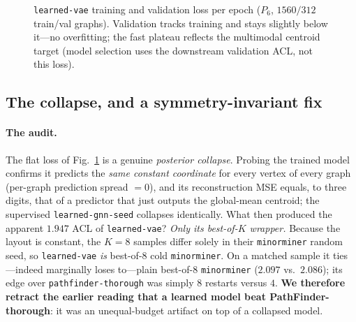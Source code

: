 \documentclass[acmsmall,anonymous,nonacm]{acmart}
\begin{document}
\begin{figure}[t]
\centering
{}
\caption{\texttt{learned-vae} training and validation loss per epoch ($P_6$, $1560/312$
train/val graphs). Validation tracks training and stays slightly below it---no
overfitting; the fast plateau reflects the multimodal centroid target (model
selection uses the downstream validation ACL, not this loss).}
\label{fig:vaeloss}
\end{figure}

\subsection{The collapse, and a symmetry-invariant fix}
\label{sec:learn-collapse}

\paragraph{The audit.} The flat loss of Fig.~\ref{fig:vaeloss} is a genuine
\emph{posterior collapse}. Probing the trained model confirms it predicts the
\emph{same constant coordinate} for every vertex of every graph (per-graph prediction
spread $=0$), and its reconstruction MSE equals, to three digits, that of a predictor
that just outputs the global-mean centroid; the supervised \texttt{learned-gnn-seed}
collapses identically. What then produced the apparent $1.947$ ACL of
\texttt{learned-vae}? \emph{Only its best-of-$K$ wrapper.} Because the layout is
constant, the $K{=}8$ samples differ solely in their \texttt{minorminer} random seed,
so \texttt{learned-vae} \emph{is} best-of-$8$ cold \texttt{minorminer}. On a matched
sample it ties---indeed marginally loses to---plain best-of-$8$ \texttt{minorminer}
($2.097$ vs.\ $2.086$); its edge over \texttt{pathfinder-thorough} was simply $8$
restarts versus $4$. \textbf{We therefore retract the earlier reading that a learned
model beat PathFinder-thorough}: it was an unequal-budget artifact on top of a
collapsed model.
\end{document}
